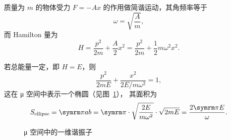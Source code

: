 \begin{example}[一维谐振子]
  质量为 $m$ 的物体受力 $F=-Ax$ 的作用做简谐运动，其角频率等于
  \begin{equation}
    \omega = \sqrt{\frac{A}{m}},
  \end{equation}
  而 Hamilton 量为
  \begin{equation}
    H = \frac{p^2}{2m} + \frac{A}{2} x^2
      = \frac{p^2}{2m} + \frac{1}{2} m \omega^2 x^2.
  \end{equation}

  若总能量一定，即 $H=E$，则
  \begin{equation}
    \frac{p^2}{2mE} + \frac{x^2}{2E / m \omega^2} = 1,
  \end{equation}
  这在 μ 空间中表示一个椭圆（见图~\ref{fig:harmonic-oscillator-in-mu-space}），
  其面积为
  \begin{equation} \label{eq:ellipse-of-harmonic-oscillator-in-mu-space}
    S_\text{ellipse} = \pp ab
      = \pp \cdot \sqrt{\frac{2E}{m \omega^2}} \cdot \sqrt{2mE}
      = \frac{2 \pp E}{\omega}.
  \end{equation}
\end{example}

\begin{figure}[ht]
  \centering
  \FIGPLACEHOLDER
  \caption{μ 空间中的一维谐振子}
  \label{fig:harmonic-oscillator-in-mu-space}
\end{figure}

